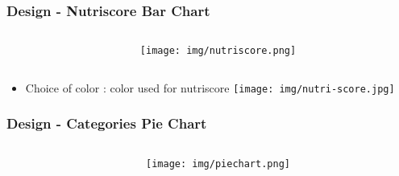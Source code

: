 \documentclass{beamer}
\begin{document}
\begin{frame}
\frametitle{Design - Nutriscore Bar Chart}
\begin{columns}[T]
  \begin{column}{.7\textwidth}
    \begin{table}
    \end{table}
  \end{column}
  \begin{column}{.25\textwidth}
    \begin{figure}
      \centering
      \texttt{[image: img/nutriscore.png]}
    \end{figure}
  \end{column}
\end{columns}
\begin{itemize}
\item Choice of color : color used for nutriscore
\texttt{[image: img/nutri-score.jpg]} 
\end{itemize}
\end{frame}

\begin{frame}
\frametitle{Design - Categories Pie Chart}

\begin{columns}[T]
  \begin{column}{.7\textwidth}
    \begin{table}
    \end{table}
  \end{column}
  \begin{column}{.25\textwidth}
    \begin{figure}
      \centering
      \texttt{[image: img/piechart.png]}
    \end{figure}
  \end{column}
\end{columns}
\end{frame}
\end{document}
